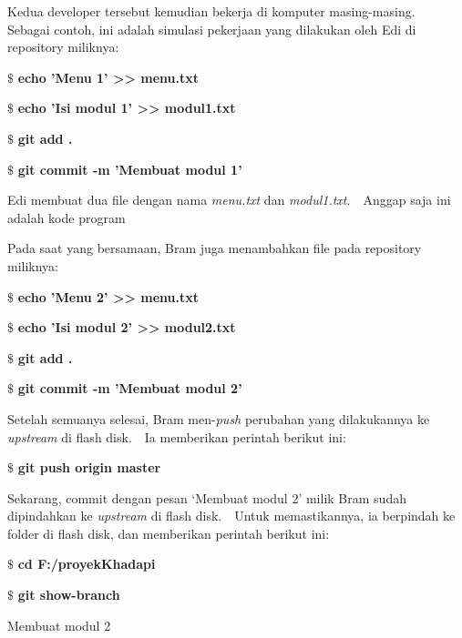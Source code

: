 \vspace{12pt}
\noindent 
Kedua developer tersebut kemudian bekerja di komputer masing-masing. $  $ $  $ Sebagai contoh, ini adalah simulasi pekerjaan yang dilakukan oleh Edi di repository miliknya: \par
\noindent 
 $  \$  $ \textbf{echo 'Menu 1' >> menu.txt} \par
\noindent 
 $  \$  $ \textbf{echo 'Isi modul 1' >> modul1.txt} \par
\noindent 
 $  \$  $ \textbf{git add .} \par
\noindent 
 $  \$  $ \textbf{git commit -m 'Membuat modul 1'} \par
\noindent 
Edi membuat dua file dengan nama \textit{menu.txt} dan \textit{modul1.txt}. $  $ $  $ Anggap saja ini adalah kode program  \par
\noindent 
Pada saat yang bersamaan, Bram juga menambahkan file pada repository miliknya: \par
\vspace{12pt}
\noindent 
 $  \$  $ \textbf{echo 'Menu 2' >> menu.txt} \par
\noindent 
 $  \$  $ \textbf{echo 'Isi modul 2' >> modul2.txt} \par
\noindent 
 $  \$  $ \textbf{git add .} \par
\noindent 
 $  \$  $ \textbf{git commit -m 'Membuat modul 2'} \par
\noindent 
\vspace{12pt}
\noindent 
Setelah semuanya selesai, Bram men-\textit{push} perubahan yang dilakukannya ke \textit{upstream} di flash disk. $  $ $  $ Ia memberikan perintah berikut ini: \par
\vspace{12pt}
\noindent 
 $  \$  $ \textbf{git push origin master} \par
\noindent 
\vspace{12pt}
\noindent 
Sekarang, commit dengan pesan ‘Membuat modul 2’ milik Bram sudah dipindahkan ke \textit{upstream }di flash disk. $  $ $  $ Untuk memastikannya, ia berpindah ke folder di flash disk, dan memberikan perintah berikut ini: \par
\vspace{12pt}
\noindent 
 $  \$  $ \textbf{cd F:/proyek}\textbf{Khadapi} \par
\noindent 
 $  \$  $ \textbf{git show-branch} \par
\noindent 
[master] Membuat modul 2 \par
\noindent 
\vspace{12pt}

